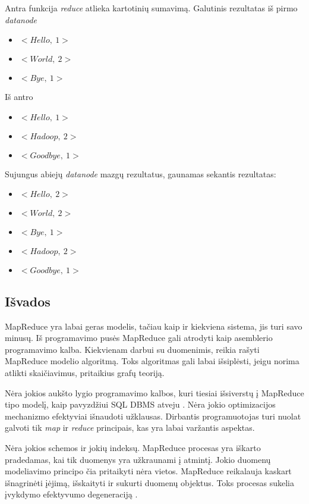 \documentclass[10pt]{IEEEtran}
\begin{document}
		Antra funkcija \textit{reduce} atlieka kartotinių sumavimą. Galutinis rezultatas iš pirmo \textit{datanode}

		\begin{itemize}
			\item $<Hello,~1>$
			\item $<World,~2>$
			\item $<Bye,~1>$
		\end{itemize}

		Iš antro 

		\begin{itemize}
			\item $<Hello,~1>$
			\item $<Hadoop,~2>$
			\item $<Goodbye,~1>$
		\end{itemize}

		Sujungus abiejų \textit{datanode} mazgų rezultatus, gaunamas sekantis rezultatas:

		\begin{itemize}
			\item $<Hello,~2>$
			\item $<World,~2>$
			\item $<Bye,~1>$
			\item $<Hadoop,~2>$
			\item $<Goodbye,~1>$
		\end{itemize}

	\subsection{Išvados}

		MapReduce yra labai geras modelis, tačiau kaip ir kiekviena sistema, jis turi savo minusų. Iš programavimo pusės MapReduce gali atrodyti kaip asemblerio programavimo kalba. Kiekvienam darbui su duomenimis, reikia rašyti MapReduce modelio algoritmą. Toks algoritmas gali labai išsiplėsti, jeigu norima atlikti skaičiavimus, pritaikius grafų teoriją.

		Nėra jokios aukšto lygio programavimo kalbos, kuri tiesiai išsiverstų į MapReduce tipo modelį, kaip pavyzdžiui SQL DBMS atveju \cite{lee2012parallel}. Nėra jokio optimizacijos mechanizmo efektyviai išnaudoti užklausas. Dirbantis programuotojas turi nuolat galvoti tik \textit{map} ir \textit{reduce} principais, kas yra labai varžantis aspektas.

		Nėra jokios schemos ir jokių indeksų. MapReduce procesas yra iškarto pradedamas, kai tik duomenys yra užkraunami į atmintį. Jokio duomenų modeliavimo principo čia pritaikyti nėra vietos. MapReduce reikalauja kaskart išnagrinėti įėjimą, išskaityti ir sukurti duomenų objektus. Toks procesas sukelia įvykdymo efektyvumo degeneraciją \cite{pavlo2009comparison}. 
\end{document}
